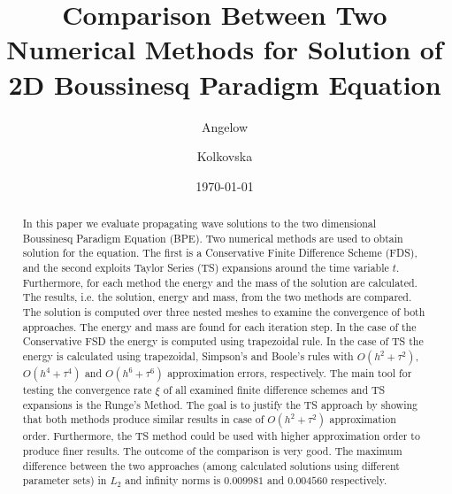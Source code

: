\documentclass[%
 aip,
cp,  %
 amsmath,amssymb,%
 reprint,%
]{revtex4-2}
\begin{document}
\title{Comparison Between Two Numerical Methods for Solution of 2D Boussinesq Paradigm Equation}%

\author{Angelow} %
\author{Kolkovska}%

\date{\today} %

\begin{abstract}
In this paper we evaluate propagating wave solutions to the two dimensional Boussinesq Paradigm Equation (BPE).
Two numerical methods are used to obtain solution for the equation. The first is a Conservative Finite Difference Scheme (FDS), and the second exploits Taylor Series (TS) expansions around the time variable $t$. Furthermore, for each method the energy and the mass of the solution are calculated. The results, i.e. the solution, energy and mass, from the two methods are compared.
The solution is computed over three nested meshes to examine the convergence of both approaches. The energy and mass are found for each iteration step. In the case of the Conservative FSD the energy is computed using trapezoidal rule. In the case of TS the energy is calculated using trapezoidal, Simpson's and Boole's rules with $O(h^{2} + \tau^2 )$, $O(h^{4} + \tau^4 )$ and $O(h^{6} + \tau^6 )$ approximation errors, respectively. The main tool for testing the convergence rate $\xi$ of all examined finite difference schemes and TS expansions is the Runge's Method.
The goal is to justify the TS approach by showing that both methods produce similar results in case of $O(h^{2} + \tau^2 )$ approximation order. Furthermore, the TS method could be used with higher approximation order to produce finer results. The outcome of the comparison is very good. The maximum difference between the two approaches (among calculated solutions using different parameter sets) in $L_2$ and infinity norms is $0.009981$ and $0.004560$ respectively.

\end{abstract}

\maketitle
\end{document}
